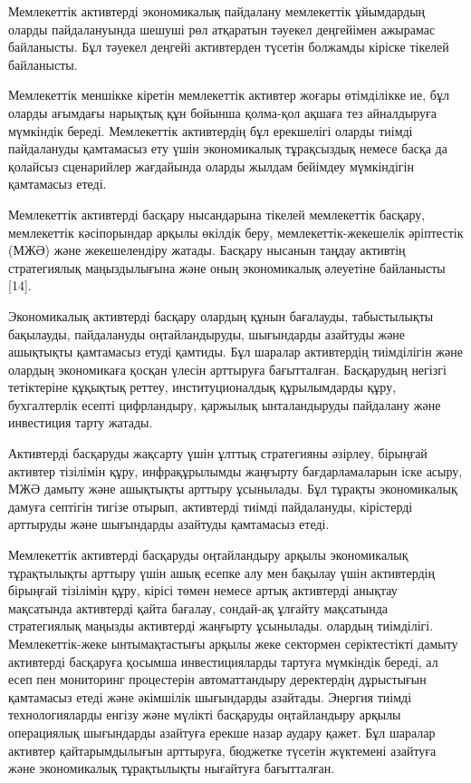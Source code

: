 \begin{multicols}{2}
Мемлекеттік активтерді экономикалық пайдалану мемлекеттік ұйымдардың
оларды пайдалануында шешуші рөл атқаратын тәуекел деңгейімен ажырамас
байланысты. Бұл тәуекел деңгейі активтерден түсетін болжамды кіріске
тікелей байланысты.

Мемлекеттік меншікке кіретін мемлекеттік активтер жоғары өтімділікке ие,
бұл оларды ағымдағы нарықтық құн бойынша қолма-қол ақшаға тез
айналдыруға мүмкіндік береді. Мемлекеттік активтердің бұл ерекшелігі
оларды тиімді пайдалануды қамтамасыз ету үшін экономикалық тұрақсыздық
немесе басқа да қолайсыз сценарийлер жағдайында оларды жылдам бейімдеу
мүмкіндігін қамтамасыз етеді.

Мемлекеттік активтерді басқару нысандарына тікелей мемлекеттік басқару,
мемлекеттік кәсіпорындар арқылы өкілдік беру, мемлекеттік-жекешелік
әріптестік (МЖӘ) және жекешелендіру жатады. Басқару нысанын таңдау
активтің стратегиялық маңыздылығына және оның экономикалық әлеуетіне
байланысты {[}14{]}.

Экономикалық активтерді басқару олардың құнын бағалауды, табыстылықты
бақылауды, пайдалануды оңтайландыруды, шығындарды азайтуды және
ашықтықты қамтамасыз етуді қамтиды. Бұл шаралар активтердің тиімділігін
және олардың экономикаға қосқан үлесін арттыруға бағытталған. Басқарудың
негізгі тетіктеріне құқықтық реттеу, институционалдық құрылымдарды құру,
бухгалтерлік есепті цифрландыру, қаржылық ынталандыруды пайдалану және
инвестиция тарту жатады.

Активтерді басқаруды жақсарту үшін ұлттық стратегияны әзірлеу, бірыңғай
активтер тізілімін құру, инфрақұрылымды жаңғырту бағдарламаларын іске
асыру, МЖӘ дамыту және ашықтықты арттыру ұсынылады. Бұл тұрақты
экономикалық дамуға септігін тигізе отырып, активтерді тиімді
пайдалануды, кірістерді арттыруды және шығындарды азайтуды қамтамасыз
етеді.

Мемлекеттік активтерді басқаруды оңтайландыру арқылы экономикалық
тұрақтылықты арттыру үшін ашық есепке алу мен бақылау үшін активтердің
бірыңғай тізілімін құру, кірісі төмен немесе артық активтерді анықтау
мақсатында активтерді қайта бағалау, сондай-ақ ұлғайту мақсатында
стратегиялық маңызды активтерді жаңғырту ұсынылады. олардың тиімділігі.
Мемлекеттік-жеке ынтымақтастығы арқылы жеке сектормен серіктестікті
дамыту активтерді басқаруға қосымша инвестицияларды тартуға мүмкіндік
береді, ал есеп пен мониторинг процестерін автоматтандыру деректердің
дұрыстығын қамтамасыз етеді және әкімшілік шығындарды азайтады. Энергия
тиімді технологияларды енгізу және мүлікті басқаруды оңтайландыру арқылы
операциялық шығындарды азайтуға ерекше назар аудару қажет. Бұл шаралар
активтер қайтарымдылығын арттыруға, бюджетке түсетін жүктемені азайтуға
және экономикалық тұрақтылықты нығайтуға бағытталған.


\end{multicols}
